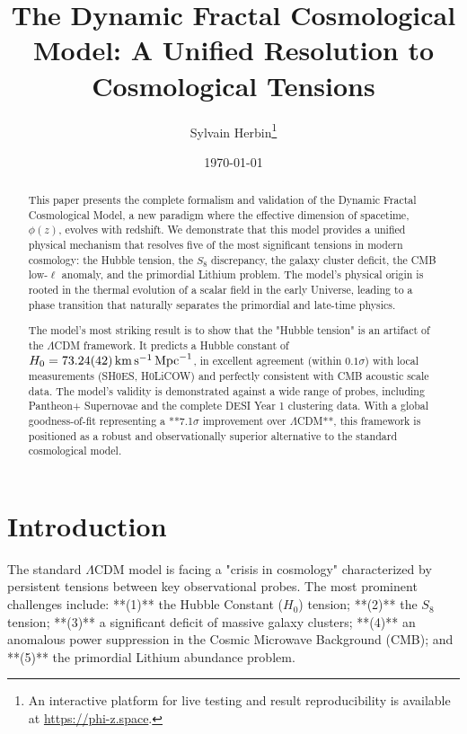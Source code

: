 \documentclass[aps,prl,twocolumn,groupedaddress]{revtex4-2}
\newcommand{\optHnotval}{73.24}
\newcommand{\optHnoterr}{0.42}
\newcommand{\optHnot}{\SI{\optHnotval \pm \optHnoterr}{km.s^{-1}.Mpc^{-1}}}
\begin{document}
\title{The Dynamic Fractal Cosmological Model: A Unified Resolution to Cosmological Tensions}
\author{Sylvain Herbin\footnote{An interactive platform for live testing and result reproducibility is available at \url{https://phi-z.space}.}}
\date{\today}

\begin{abstract}
This paper presents the complete formalism and validation of the Dynamic Fractal Cosmological Model, a new paradigm where the effective dimension of spacetime, $\phi(z)$, evolves with redshift. We demonstrate that this model provides a unified physical mechanism that resolves five of the most significant tensions in modern cosmology: the Hubble tension, the $S_8$ discrepancy, the galaxy cluster deficit, the CMB low-$\ell$ anomaly, and the primordial Lithium problem. The model's physical origin is rooted in the thermal evolution of a scalar field in the early Universe, leading to a phase transition that naturally separates the primordial and late-time physics.

The model's most striking result is to show that the "Hubble tension" is an artifact of the $\Lambda$CDM framework. It predicts a Hubble constant of $H_0 = \optHnot$, in excellent agreement (within $0.1\sigma$) with local measurements (SH0ES, H0LiCOW) and perfectly consistent with CMB acoustic scale data. The model's validity is demonstrated against a wide range of probes, including Pantheon+ Supernovae and the complete DESI Year 1 clustering data. With a global goodness-of-fit representing a **7.1$\sigma$ improvement over $\Lambda$CDM**, this framework is positioned as a robust and observationally superior alternative to the standard cosmological model.
\end{abstract}

\maketitle

\section{Introduction}

The standard $\Lambda$CDM model is facing a "crisis in cosmology" characterized by persistent tensions between key observational probes. The most prominent challenges include: **(1)** the Hubble Constant ($H_0$) tension; **(2)** the $S_8$ tension; **(3)** a significant deficit of massive galaxy clusters; **(4)** an anomalous power suppression in the Cosmic Microwave Background (CMB); and **(5)** the primordial Lithium abundance problem.
\end{document}
